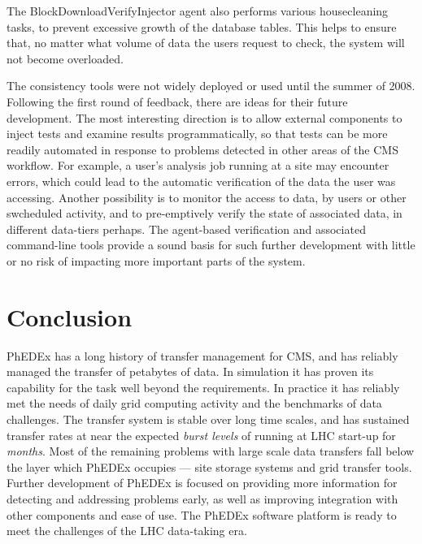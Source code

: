 \documentclass{PoS}
\begin{document}
The BlockDownloadVerifyInjector agent also performs various
housecleaning tasks, to prevent excessive growth of the database
tables. This helps to ensure that, no matter what volume of data the
users request to check, the system will not become overloaded.

The consistency tools were not widely deployed or used until the
summer of 2008. Following the first round of feedback, there are ideas
for their future development. The most interesting direction is to
allow external components to inject tests and examine results
programmatically, so that tests can be more readily automated in
response to problems detected in other areas of the CMS workflow. For
example, a user's analysis job running at a site may encounter errors,
which could lead to the automatic verification of the data the user
was accessing. Another possibility is to monitor the access to data,
by users or other swcheduled activity, and to pre-emptively verify the
state of associated data, in different data-tiers perhaps. The
agent-based verification and associated command-line tools provide a
sound basis for such further development with little or no risk of
impacting more important parts of the system.

\section{Conclusion}

PhEDEx has a long history of transfer management for CMS, and has
reliably managed the transfer of petabytes of data.  In simulation it
has proven its capability for the task well beyond the requirements.
In practice it has reliably met the needs of daily grid computing
activity and the benchmarks of data challenges.  The transfer system
is stable over long time scales, and has sustained transfer rates at
near the expected \emph{burst levels} of running at LHC start-up for
\emph{months}.  Most of the remaining problems with large scale data
transfers fall below the layer which PhEDEx occupies --- site storage
systems and grid transfer tools.  Further development of PhEDEx is
focused on providing more information for detecting and addressing
problems early, as well as improving integration with other components
and ease of use.  The PhEDEx software platform is ready to meet the
challenges of the LHC data-taking era.



\end{document}
